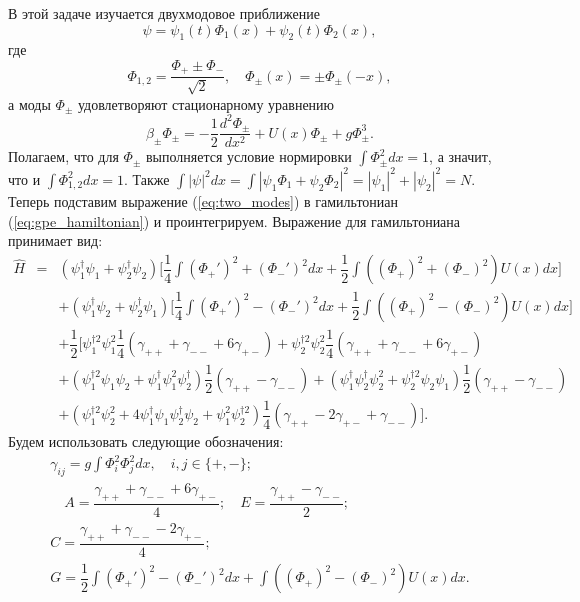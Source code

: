 \documentclass[12pt]{article}
\begin{document}
В этой задаче изучается двухмодовое приближение
%
\begin{equation}
\psi = \psi_1(t) \Phi_1(x) + \psi_2(t) \Phi_2(x),
\label{eq:two_modes}
\end{equation}
%
где
%
\begin{equation}
\Phi_{1,2} = \dfrac{\Phi_+ \pm \Phi_-}{\sqrt{2}}, \quad \Phi_{\pm}(x) = \pm \Phi_{\pm} (-x),
\label{eq:conditions}
\end{equation}
%
а моды $\Phi_{\pm}$ удовлетворяют стационарному уравнению
%
\begin{equation}
\beta_{\pm} \Phi_{\pm} = -\dfrac{1}{2} \dfrac{d^2 \Phi_{\pm}}{dx^2} + U(x) \Phi_{\pm} + g \Phi_{\pm}^3.
\label{eq:stationary}
\end{equation}
%
Полагаем, что для $\Phi_{\pm}$ выполняется условие нормировки $\int \Phi_{\pm}^2 dx = 1$, а значит, что и $\int \Phi_{1,2}^2 dx = 1$.
Также $\int |\psi|^2 dx = \int |\psi_1 \Phi_1 + \psi_2 \Phi_2|^2 = |\psi_1|^2 + |\psi_2|^2 = N$.
Теперь подставим выражение (\ref{eq:two_modes}) в гамильтониан (\ref{eq:gpe_hamiltonian}) и проинтегрируем.
Выражение для гамильтониана принимает вид:
%
\begin{eqnarray*}
\hat{H} & = & (\psi_1^\dag \psi_1 + \psi_2^\dag \psi_2) \Big[ \dfrac{1}{4} \int (\Phi_+')^2 + (\Phi_-')^2  dx + \dfrac{1}{2} \int ((\Phi_+)^2 + (\Phi_-)^2) U(x) dx \Big] \\[10pt]
&& +(\psi_1^\dag \psi_2 + \psi_2^\dag \psi_1) \Big[ \dfrac{1}{4} \int (\Phi_+')^2 - (\Phi_-')^2 dx + \dfrac{1}{2} \int ((\Phi_+)^2 - (\Phi_-)^2)U(x) dx \Big] \\[10pt]
&& +\dfrac{1}{2} \Big[ \psi_1^{\dag 2} \psi_1^2 \dfrac{1}{4} (\gamma_{++} + \gamma_{--} + 6 \gamma_{+-}) + \psi_2^{\dag 2} \psi_2^2 \dfrac{1}{4}(\gamma_{++} + \gamma_{--} + 6 \gamma_{+-})  \\[10pt]
&& +(\psi_1^{\dag 2} \psi_1 \psi_2 + \psi_1^\dag \psi_1^2 \psi_2^\dag) \dfrac{1}{2}(\gamma_{++} - \gamma_{--}) + (\psi_1^\dag \psi_2^\dag \psi_2^2 + \psi_2^{\dag 2} \psi_2 \psi_1) \dfrac{1}{2} (\gamma_{++} - \gamma_{--})\\[10pt]
&& + (\psi_1^{\dag 2} \psi_2^2 + 4 \psi_1^\dag \psi_1 \psi_2^\dag \psi_2 + \psi_1^2 \psi_2^{\dag 2}) \dfrac{1}{4} (\gamma_{++} - 2 \gamma_{+-} + \gamma_{--}) \Big].
\end{eqnarray*}
%
Будем использовать следующие обозначения:
%
\begin{equation}
\begin{array}{c}
	\gamma_{ij} = g \int \Phi_i^2 \Phi_j^2 dx, \quad i,j \in \{+,-\}; \\[10pt]
	\quad A = \dfrac{\gamma_{++} + \gamma_{--} + 6 \gamma_{+-}}{4}; \quad E = \dfrac{\gamma_{++} - \gamma_{--}}{2}; \\[10pt]
	C = \dfrac{\gamma_{++} + \gamma_{--} - 2\gamma_{+-}}{4}; \\[10pt]
	G = \dfrac{1}{2} \int (\Phi_+')^2 - (\Phi_-')^2 dx + \int ((\Phi_+)^2 - (\Phi_-)^2)U(x) dx.
\end{array}
\label{eq:subs}
\end{equation}
\end{document}
